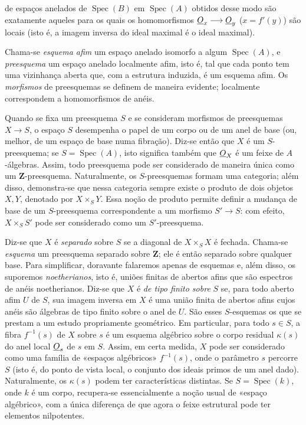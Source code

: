 de espaços anelados de $\operatorname{Spec}(B)$ em
$\operatorname{Spec}(A)$ obtidos desse modo são exatamente aqueles para
os quais os homomorfismos $\underline{O}_x\longrightarrow\underline{O}_y$ ($x=f'(y)$) são
locais (isto é, a imagem inversa do ideal maximal é o ideal maximal).

Chama-se \emph{esquema afim} um espaço anelado isomorfo a algum
$\operatorname{Spec}(A)$, e \emph{preesquema} um espaço anelado localmente
afim, isto é, tal que cada ponto tem uma vizinhança aberta que, com a
estrutura induzida, é um esquema afim. Os \emph{morfismos} de preesquemas se
definem de maneira evidente; localmente correspondem a homomorfismos de anéis.

Quando se fixa um preesquema $S$ e se consideram morfismos de preesquemas
$X\longrightarrow S$, o espaço $S$ desempenha o papel de um corpo ou de um
anel de base (ou, melhor, de um espaço de base numa fibração). Diz-se
então que $X$ é um $S$-preesquema; se $S=\operatorname{Spec}(A)$, isto
significa também que $\underline{O}_X$ é um feixe de $A$-álgebras. Assim, todo preesquema
pode ser considerado de maneira única como um $\mathbf Z$-preesquema. Naturalmente,
os $S$-preesquemas formam uma categoria; além disso, demonstra-se que nessa
categoria sempre existe o produto de dois objetos $X,Y$, denotado por
$X\times_S Y$. Essa noção de produto permite definir a mudança de base de um
$S$-preesquema correspondente a um morfismo $S'\longrightarrow S$: com efeito,
$X\times_S S'$ pode ser considerado como um $S'$-preesquema.

Diz-se que $X$ é \emph{separado} sobre $S$ se a diagonal de
$X\times_S X$ é fechada. Chama-se \emph{esquema} um preesquema separado
sobre $\mathbf Z$; ele é então separado sobre qualquer base. Para simplificar,
doravante falaremos apenas de esquemas e, além disso, os suporemos
\emph{noetherianos}, isto é, uniões finitas de abertos afins que são
espectros de anéis noetherianos. Diz-se que $X$ é \emph{de tipo finito
sobre} $S$ se, para todo aberto afim $U$ de $S$, sua imagem inversa em $X$ é
uma união finita de abertos afins cujos anéis são álgebras de tipo finito
sobre o anel de $U$. São esses $S$-esquemas os que se prestam a um estudo
propriamente geométrico. Em particular, para todo $s\in S$, a fibra
$f^{-1}(s)$ de $X$ sobre $s$ é um esquema algébrico sobre o corpo residual
$\kappa(s)$ do anel local $\underline{O}_s$ de $s$ em $S$. Assim, em certa medida, $X$
pode ser considerado como uma família de «espaços algébricos» $f^{-1}(s)$, onde
o parâmetro $s$ percorre $S$ (isto é, do ponto de vista local, o
conjunto dos ideais primos de um anel dado). Naturalmente, os
$\kappa(s)$ podem ter características distintas. Se
$S=\operatorname{Spec}(k)$, onde $k$ é um corpo, recupera-se essencialmente a
noção usual de «espaço algébrico», com a única diferença de que agora o
feixe estrutural pode ter elementos nilpotentes.

